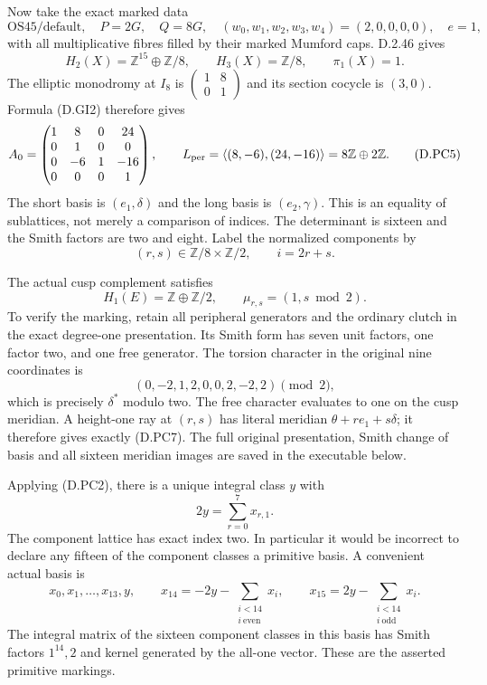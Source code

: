 Now take the exact marked data
\[
 \mathrm{OS45/default},\quad P=2G,\quad Q=8G,\quad
 (w_0,w_1,w_2,w_3,w_4)=(2,0,0,0,0),\quad e=1,              \tag{D.PC3}
\]
with all multiplicative fibres filled by their marked Mumford caps.
D.2.46 gives
\[
 H_2(X)=\mathbb Z^{15}\oplus\mathbb Z/8,\qquad
 H_3(X)=\mathbb Z/8,\qquad \pi_1(X)=1.
                                                               \tag{D.PC4}
\]
The elliptic monodromy at $I_8$ is
$\left(\begin{smallmatrix}1&8\\0&1\end{smallmatrix}\right)$
and its section cocycle is $(3,0)$. Formula (D.GI2) therefore gives
\[
 A_0=\begin{pmatrix}
 1&8&0&24\\0&1&0&0\\0&-6&1&-16\\0&0&0&1
 \end{pmatrix},\qquad
 L_{\rm per}=\left\langle(8,-6),(24,-16)\right\rangle
                 =8\mathbb Z\oplus2\mathbb Z.             \tag{D.PC5}
\]
The short basis is $(e_1,\delta)$ and the long basis is $(e_2,\gamma)$.
This is an equality of sublattices, not merely a comparison of
indices. The determinant is sixteen and the Smith factors are two
and eight. Label the normalized components by
\[
             (r,s)\in\mathbb Z/8\times\mathbb Z/2,
             \qquad i=2r+s.                              \tag{D.PC6}
\]

The actual cusp complement satisfies
\[
 H_1(E)=\mathbb Z\oplus\mathbb Z/2,
                      \qquad \mu_{r,s}=(1,s\bmod2).      \tag{D.PC7}
\]
To verify the marking, retain all peripheral generators and the
ordinary clutch in the exact degree-one presentation. Its Smith
form has seven unit factors, one factor two, and one free generator.
The torsion character in the original nine coordinates is
\[
                  (0,-2,1,2,0,0,2,-2,2)\pmod2,
                                                               \tag{D.PC8}
\]
which is precisely $\delta^*$ modulo two. The free character
evaluates to one on the cusp meridian. A height-one ray at
$(r,s)$ has literal meridian $\theta+r e_1+s\delta$; it
therefore gives exactly (D.PC7). The full original presentation,
Smith change of basis and all sixteen meridian images are saved
in the executable below.

Applying (D.PC2), there is a unique integral class $y$ with
\[
                    2y=\sum_{r=0}^{7}x_{r,1}.             \tag{D.PC9}
\]
The component lattice has exact index two. In particular it would
be incorrect to declare any fifteen of the component classes a
primitive basis. A convenient actual basis is
\[
 x_0,x_1,\ldots,x_{13},y,\qquad
 x_{14}=-2y-\sum_{\substack{i<14\\i\ \mathrm{even}}}x_i,
 \qquad
 x_{15}=2y-\sum_{\substack{i<14\\i\ \mathrm{odd}}}x_i.
                                                               \tag{D.PC10}
\]
The integral matrix of the sixteen component classes in this basis
has Smith factors $1^{14},2$ and kernel generated by the all-one
vector. These are the asserted primitive markings.

